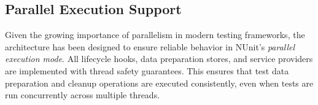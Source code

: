 \subsection{Parallel Execution Support}
Given the growing importance of parallelism in modern testing frameworks, the architecture has been designed to ensure reliable behavior in NUnit's \textit{parallel execution mode}. All lifecycle hooks, data preparation stores, and service providers are implemented with thread safety guarantees. This ensures that test data preparation and cleanup operations are executed consistently, even when tests are run concurrently across multiple threads.

